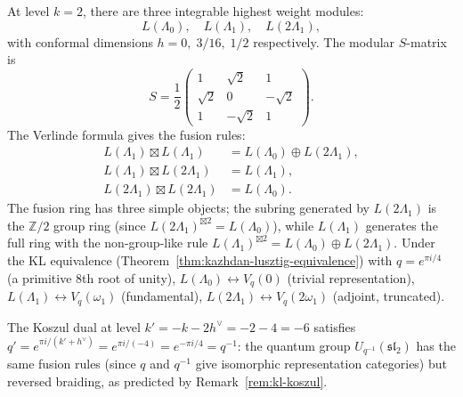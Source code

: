 \begin{example}
\label{ex:sl2-level2}
At level $k = 2$, there are three integrable highest weight modules:
\[
L(\Lambda_0),\quad L(\Lambda_1),\quad L(2\Lambda_1),
\]
with conformal dimensions $h = 0,\; 3/16,\; 1/2$ respectively.
The modular $S$-matrix is
\begin{equation}\label{eq:s-matrix-sl2-level2}
S = \frac{1}{2}\begin{pmatrix}
1 & \sqrt{2} & 1 \\
\sqrt{2} & 0 & -\sqrt{2} \\
1 & -\sqrt{2} & 1
\end{pmatrix}.
\end{equation}
The Verlinde formula gives the fusion rules:
\begin{align}
L(\Lambda_1) \boxtimes L(\Lambda_1)
&= L(\Lambda_0) \oplus L(2\Lambda_1), \\
L(\Lambda_1) \boxtimes L(2\Lambda_1)
&= L(\Lambda_1), \\
L(2\Lambda_1) \boxtimes L(2\Lambda_1) &= L(\Lambda_0).
\end{align}
The fusion ring has three simple objects; the subring generated by
$L(2\Lambda_1)$ is the $\mathbb{Z}/2$ group ring (since
$L(2\Lambda_1)^{\boxtimes 2} = L(\Lambda_0)$), while $L(\Lambda_1)$
generates the full ring with the non-group-like rule
$L(\Lambda_1)^{\boxtimes 2} = L(\Lambda_0) \oplus L(2\Lambda_1)$.
Under the KL equivalence
(Theorem~\ref{thm:kazhdan-lusztig-equivalence}) with
$q = e^{\pi i/4}$ (a primitive $8$th root of unity),
$L(\Lambda_0) \leftrightarrow V_q(0)$ (trivial representation),
$L(\Lambda_1) \leftrightarrow V_q(\omega_1)$ (fundamental),
$L(2\Lambda_1) \leftrightarrow V_q(2\omega_1)$ (adjoint,
truncated).

The Koszul dual at level $k' = -k - 2h^\vee = -2 - 4 = -6$ satisfies
$q' = e^{\pi i/(k'+h^\vee)} = e^{\pi i/(-4)} = e^{-\pi i/4} = q^{-1}$: the quantum group
$U_{q^{-1}}(\mathfrak{sl}_2)$ has the same fusion rules
(since $q$ and $q^{-1}$ give isomorphic representation categories)
but reversed braiding, as predicted by
Remark~\ref{rem:kl-koszul}.
\end{example}

